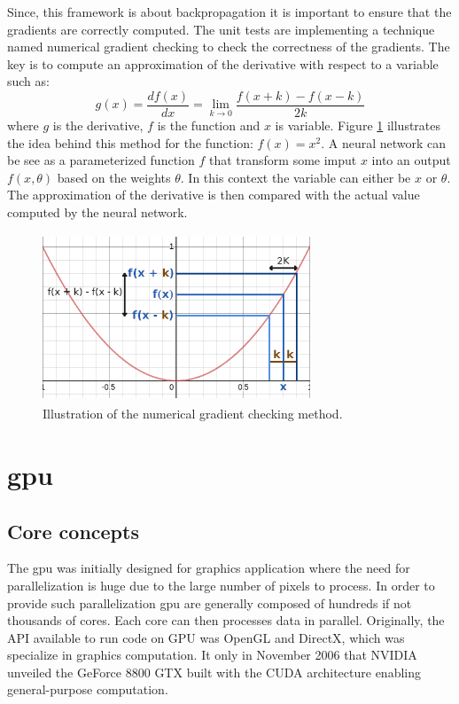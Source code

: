 \documentclass[11pt]{report}
\begin{document}
\noindent Since, this framework is about backpropagation it is important to ensure that the gradients are correctly computed. The unit tests are implementing a technique named numerical gradient checking to check the correctness of the gradients. The key is to compute an approximation of the derivative with respect to a variable such as:
\begin{equation}
g(x) = \frac{df(x)}{dx} = \lim_{k\to0} \frac{f(x + k) - f(x - k)}{2k}
\end{equation}
where $g$ is the derivative, $f$ is the function and $x$ is variable.
Figure \ref{fig:gradient_checking} illustrates the idea behind this method for the function: $f(x) = x^{2}$. A neural network can be see as a parameterized function $f$ that transform some imput $x$ into an output $f(x, \theta)$ based on the weights $\theta$. In this context the variable can either be $x$ or $\theta$. The approximation of the derivative is then compared with the actual value computed by the neural network.

\begin{figure}[h]
\centering
\includegraphics[width=8cm, height=5cm]{gradient_checking}
\caption[Illustration of the numerical gradient checking method]{Illustration of the numerical gradient checking method.}
\label{fig:gradient_checking}
\end{figure}

\section{\acrlong{gpu}}

\subsection{Core concepts} \label{sec:core_concepts}

The \acrshort{gpu} was initially designed for graphics application where the need for parallelization is huge due to the large number of pixels to process. In order to provide such parallelization \acrshort{gpu} are generally composed of hundreds if not thousands of cores. Each core can then processes data in parallel. Originally, the API available to run code on GPU was OpenGL and DirectX, which was specialize in graphics computation. It only in November 2006 that NVIDIA unveiled the GeForce 8800 GTX built with the CUDA architecture enabling general-purpose computation.
\\
\end{document}
